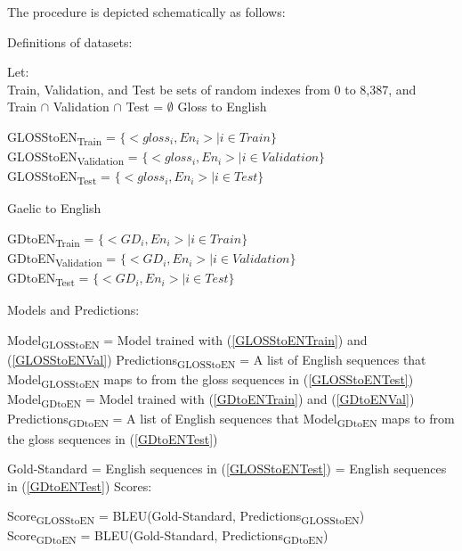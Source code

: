 \documentclass[a4paper]{article}
\begin{document}
The procedure is depicted schematically as follows:
\begin{exe}
\ex Definitions of datasets:
	\begin{xlist}
	\ex Let: \\
    		Train, Validation, and Test be sets of random indexes from 0 to 8,387, and \\
    		Train $\cap$ Validation $\cap$ Test = $\emptyset$ 
	\ex Gloss to English
		\begin{xlist}
		\ex \label{GLOSStoENTrain} GLOSStoEN\textsubscript{Train}   = $\{<gloss_i,En_i>  \mid i \in Train \}$ \\
		\ex \label{GLOSStoENVal} GLOSStoEN\textsubscript{Validation}   = $\{<gloss_i,En_i>  \mid i \in Validation \}$ \\
		\ex \label{GLOSStoENTest}GLOSStoEN\textsubscript{Test} = $\{<gloss_i,En_i>  \mid i \in Test \}$ \\
		\end{xlist}
	
	\ex Gaelic to English
		\begin{xlist}
		\ex \label{GDtoENTrain} GDtoEN\textsubscript{Train}   = $\{<GD_i,En_i>  \mid i \in Train \}$ \\
		\ex \label{GDtoENVal} GDtoEN\textsubscript{Validation}   = $\{<GD_i,En_i>  \mid i \in Validation \}$ \\
		\ex \label{GDtoENTest} GDtoEN\textsubscript{Test}    = $\{<GD_i,En_i>  \mid i \in Test \}$ \\
		\end{xlist}
	\end{xlist}
\end{exe}


\begin{exe}
\ex Models and Predictions: 
	\begin{xlist}
	\ex Model\textsubscript{GLOSStoEN} = Model trained with (\ref{GLOSStoENTrain}) and (\ref{GLOSStoENVal})
	\ex Predictions\textsubscript{GLOSStoEN} = A list of English sequences that Model\textsubscript{GLOSStoEN} maps to from the gloss sequences in (\ref{GLOSStoENTest}) 
	\ex Model\textsubscript{GDtoEN} = Model trained with (\ref{GDtoENTrain}) and (\ref{GDtoENVal}) 
	\ex Predictions\textsubscript{GDtoEN} = A list of English sequences that Model\textsubscript{GDtoEN} maps to from the gloss sequences in (\ref{GDtoENTest}) 
	\end{xlist}	
\ex Gold-Standard = English sequences in (\ref{GLOSStoENTest}) = English sequences in (\ref{GDtoENTest})
\ex Scores: \\
  \begin{xlist}
	\ex Score\textsubscript{GLOSStoEN} = BLEU(Gold-Standard, Predictions\textsubscript{GLOSStoEN}) \\
	\ex Score\textsubscript{GDtoEN} = BLEU(Gold-Standard, Predictions\textsubscript{GDtoEN}) \\
  \end{xlist}
\end{exe}
\end{document}
